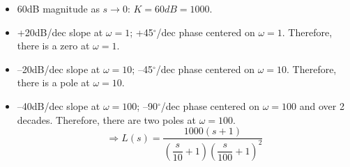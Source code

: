 \documentclass{book}
\begin{document}
\begin{enumerate}
	\begin{itemize}
		\item 60dB magnitude as $ s\to 0 $: $ K=60dB=1000 $.
		\item +20dB/dec slope at $ \omega=1 $; +45$ ^\circ $/dec phase centered on $ \omega=1 $. Therefore, there is a zero at $ \omega=1 $.
		\item --20dB/dec slope at $ \omega=10 $; --45$ ^\circ $/dec phase centered on $ \omega=10 $. Therefore, there is a pole at $ \omega=10 $.
		\item --40dB/dec slope at $ \omega=100 $; --90$ ^\circ $/dec phase centered on $ \omega=100 $ and over 2 decades. Therefore, there are two poles at $ \omega=100 $.
		\[ \Rightarrow L(s) = \frac{1000\left(s+1\right)}{\left(\dfrac{s}{10}+1\right)\left(\dfrac{s}{100}+1\right)^2} \]
	\end{itemize}
	
\end{enumerate}
\end{document}
